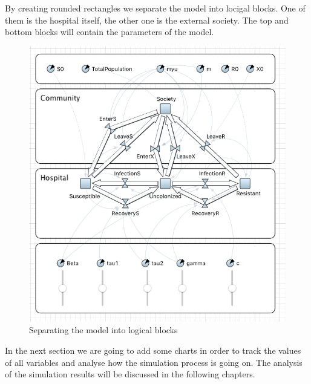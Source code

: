 By creating rounded rectangles we separate the model into locigal blocks. One of them is the hospital itself, the other one is the external society. The top and bottom blocks will contain the parameters of the model.

\begin{figure}[H]
  \centering
  \includegraphics[height=0.6\textwidth]{img/screens/boxes/boxes4}
  \caption{Separating the model into logical blocks}
\end{figure}

In the next section we are going to add some charts in order to track the values of all variables and analyse how the simulation process is going on. The analysis of the simulation results will be discussed in the following chapters.